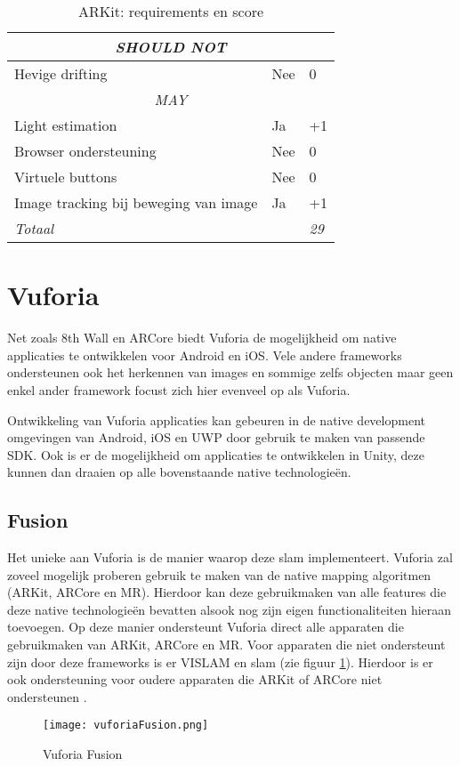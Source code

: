 \begin{table}[]
\begin{tabular}{@{}lll@{}}
        \multicolumn{3}{c}{\textit{SHOULD NOT}}                                              \\ \midrule
        Hevige drifting                            & Nee                    & 0              \\ \midrule
        \multicolumn{3}{c}{\textit{MAY}}                                                     \\ \midrule
        Light estimation                           & Ja                     & +1             \\
        Browser ondersteuning                      & Nee                     & 0             \\
        Virtuele buttons                           & Nee                    & 0              \\
        Image tracking bij beweging van image      & Ja                     & +1             \\ \midrule
        \textit{Totaal}                            & \multicolumn{1}{r}{}   & \textit{29}    \\ \bottomrule
    \end{tabular}
    \caption{ARKit: requirements en score}
    \label{tbl:arkitreq}
\end{table}

\section{Vuforia}
Net zoals 8th Wall en ARCore biedt Vuforia de mogelijkheid om native applicaties te ontwikkelen voor Android en iOS. Vele andere frameworks ondersteunen ook het herkennen van images en sommige zelfs objecten maar geen enkel ander framework focust zich hier evenveel op als Vuforia.  

Ontwikkeling van Vuforia applicaties kan gebeuren in de native development omgevingen van Android, iOS en UWP door gebruik te maken van passende SDK. Ook is er de mogelijkheid om applicaties te ontwikkelen in Unity, deze kunnen dan draaien op alle bovenstaande native technologieën.

\subsection{Fusion}
Het unieke aan Vuforia is de manier waarop deze \acrshort{slam} implementeert. Vuforia zal zoveel mogelijk proberen gebruik te maken van de native mapping algoritmen (ARKit, ARCore en MR). Hierdoor kan deze gebruikmaken van alle features die deze native technologieën bevatten alsook nog zijn eigen functionaliteiten hieraan toevoegen. Op deze manier ondersteunt Vuforia direct alle apparaten die gebruikmaken van ARKit, ARCore en MR. Voor apparaten die niet ondersteunt zijn door deze frameworks is er VISLAM en \acrshort{slam} (zie figuur \ref{fig:vuforiaFusion}). Hierdoor is er ook ondersteuning voor oudere apparaten die ARKit of ARCore niet ondersteunen \autocite{VuforiaFusion}.
\begin{figure}
    \texttt{[image: vuforiaFusion.png]}
    \caption{Vuforia Fusion \autocite{VuforiaFusion}}
    \label{fig:vuforiaFusion}
\end{figure}

